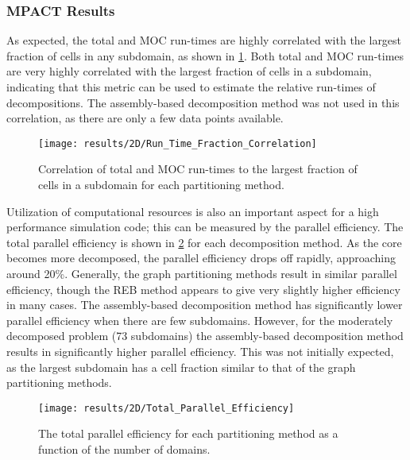 {{{      \subsubsection{MPACT Results}{\label{sssec:MPACT Results}
        As expected, the total and \ac{MOC} run-times are highly correlated with the largest fraction of cells in any subdomain, as shown in \cref{fig:Spatial Decomposition:Runtime Correlation}.
        Both total and \ac{MOC} run-times are very highly correlated with the largest fraction of cells in a subdomain, indicating that this metric can be used to estimate the relative run-times of decompositions.
        The assembly-based decomposition method was not used in this correlation, as there are only a few data points available.

        \begin{figure}
          \centering
          \texttt{[image: results/2D/Run\_Time\_Fraction\_Correlation]}
          \caption{Correlation of total and \ac{MOC} run-times to the largest fraction of cells in a subdomain for each partitioning method. \label{fig:Spatial Decomposition:Runtime Correlation}}
        \end{figure}

        Utilization of computational resources is also an important aspect for a high performance simulation code; this can be measured by the parallel efficiency.
        The total parallel efficiency is shown in \cref{fig:Spatial Decomposition:Parallel Efficiency} for each decomposition method.
        As the core becomes more decomposed, the parallel efficiency drops off rapidly, approaching around 20\%.
        Generally, the graph partitioning methods result in similar parallel efficiency, though the \ac{REB} method appears to give very slightly higher efficiency in many cases.
        The assembly-based decomposition method has significantly lower parallel efficiency when there are few subdomains.
        However, for the moderately decomposed problem (73 subdomains) the assembly-based decomposition method results in significantly higher parallel efficiency.
        This was not initially expected, as the largest subdomain has a cell fraction similar to that of the graph partitioning methods.

        \begin{figure}
          \centering
          \texttt{[image: results/2D/Total\_Parallel\_Efficiency]}
          \caption{The total parallel efficiency for each partitioning method as a function of the number of domains. \label{fig:Spatial Decomposition:Parallel Efficiency}}
        \end{figure}

}}}}
